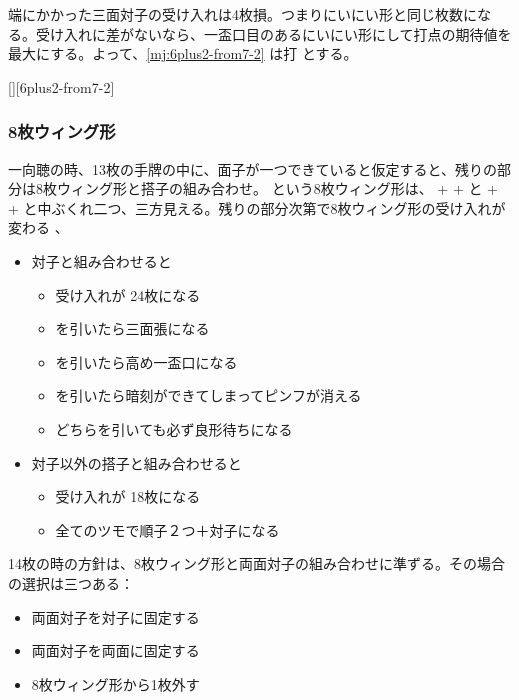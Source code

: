 \documentclass[../nankiru_main.tex]{subfiles}
\begin{document}
端にかかった三面対子の受け入れは4枚損。つまりにいにい形と同じ枚数になる。受け入れに差がないなら、一盃口目のあるにいにい形にして打点の期待値を最大にする。よって、\ref{mj:6plus2-from7-2} は打  とする\citep[][pp.~132--133]{uzaku-haikouritsu}。

[][6plus2-from7-2]

\subsubsection{8枚ウィング形}

一向聴の時、13枚の手牌の中に、面子が一つできていると仮定すると、残りの部分は8枚ウィング形と搭子の組み合わせ。 という8枚ウィング形は、 +  +  と  +  +  と中ぶくれ二つ、三方見える。残りの部分次第で8枚ウィング形の受け入れが変わる \citep{yuusee-8wing}、

\begin{itemize}
  \item 対子と組み合わせると
  \begin{itemize}
    \item 受け入れが  24枚になる
    \item {} を引いたら三面張になる
    \item {} を引いたら高め一盃口になる
    \item {} を引いたら暗刻ができてしまってピンフが消える
    \item どちらを引いても必ず良形待ちになる
  \end{itemize}
  \item 対子以外の搭子と組み合わせると
  \begin{itemize}
    \item 受け入れが  18枚になる
    \item 全てのツモで順子２つ＋対子になる
  \end{itemize}
\end{itemize}

14枚の時の方針は、8枚ウィング形と両面対子の組み合わせに準ずる。その場合の選択は三つある：

\begin{itemize}
\item 両面対子を対子に固定する
\item 両面対子を両面に固定する
\item 8枚ウィング形から1枚外す
\end{itemize}
\end{document}
